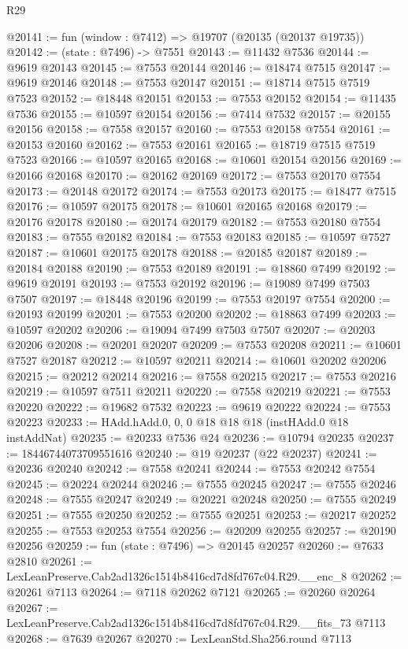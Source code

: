 \begin{lexlean}{R29}
\begin{coremodule}
@20141 := fun (window : @7412) => @19707 (@20135 (@20137 @19735))
@20142 := (state : @7496) -> @7551
@20143 := @11432 @7536
@20144 := @9619 @20143
@20145 := @7553 @20144
@20146 := @18474 @7515
@20147 := @9619 @20146
@20148 := @7553 @20147
@20151 := @18714 @7515 @7519 @7523
@20152 := @18448 @20151
@20153 := @7553 @20152
@20154 := @11435 @7536
@20155 := @10597 @20154
@20156 := @7414 @7532
@20157 := @20155 @20156
@20158 := @7558 @20157
@20160 := @7553 @20158 @7554
@20161 := @20153 @20160
@20162 := @7553 @20161
@20165 := @18719 @7515 @7519 @7523
@20166 := @10597 @20165
@20168 := @10601 @20154 @20156
@20169 := @20166 @20168
@20170 := @20162 @20169
@20172 := @7553 @20170 @7554
@20173 := @20148 @20172
@20174 := @7553 @20173
@20175 := @18477 @7515
@20176 := @10597 @20175
@20178 := @10601 @20165 @20168
@20179 := @20176 @20178
@20180 := @20174 @20179
@20182 := @7553 @20180 @7554
@20183 := @7555 @20182
@20184 := @7553 @20183
@20185 := @10597 @7527
@20187 := @10601 @20175 @20178
@20188 := @20185 @20187
@20189 := @20184 @20188
@20190 := @7553 @20189
@20191 := @18860 @7499
@20192 := @9619 @20191
@20193 := @7553 @20192
@20196 := @19089 @7499 @7503 @7507
@20197 := @18448 @20196
@20199 := @7553 @20197 @7554
@20200 := @20193 @20199
@20201 := @7553 @20200
@20202 := @18863 @7499
@20203 := @10597 @20202
@20206 := @19094 @7499 @7503 @7507
@20207 := @20203 @20206
@20208 := @20201 @20207
@20209 := @7553 @20208
@20211 := @10601 @7527 @20187
@20212 := @10597 @20211
@20214 := @10601 @20202 @20206
@20215 := @20212 @20214
@20216 := @7558 @20215
@20217 := @7553 @20216
@20219 := @10597 @7511 @20211
@20220 := @7558 @20219
@20221 := @7553 @20220
@20222 := @19682 @7532
@20223 := @9619 @20222
@20224 := @7553 @20223
@20233 := HAdd.hAdd.{0, 0, 0} @18 @18 @18 (instHAdd.{0} @18 instAddNat)
@20235 := @20233 @7536 @24
@20236 := @10794 @20235
@20237 := 18446744073709551616
@20240 := @19 @20237 (@22 @20237)
@20241 := @20236 @20240
@20242 := @7558 @20241
@20244 := @7553 @20242 @7554
@20245 := @20224 @20244
@20246 := @7555 @20245
@20247 := @7555 @20246
@20248 := @7555 @20247
@20249 := @20221 @20248
@20250 := @7555 @20249
@20251 := @7555 @20250
@20252 := @7555 @20251
@20253 := @20217 @20252
@20255 := @7553 @20253 @7554
@20256 := @20209 @20255
@20257 := @20190 @20256
@20259 := fun (state : @7496) => @20145 @20257
@20260 := @7633 @2810
@20261 := LexLeanPreserve.Cab2ad1326c1514b8416cd7d8fd767c04.R29.__enc_8
@20262 := @20261 @7113
@20264 := @7118 @20262 @7121
@20265 := @20260 @20264
@20267 := LexLeanPreserve.Cab2ad1326c1514b8416cd7d8fd767c04.R29.__fits_73 @7113
@20268 := @7639 @20267
@20270 := LexLeanStd.Sha256.round @7113

\end{coremodule}
\end{lexlean}
